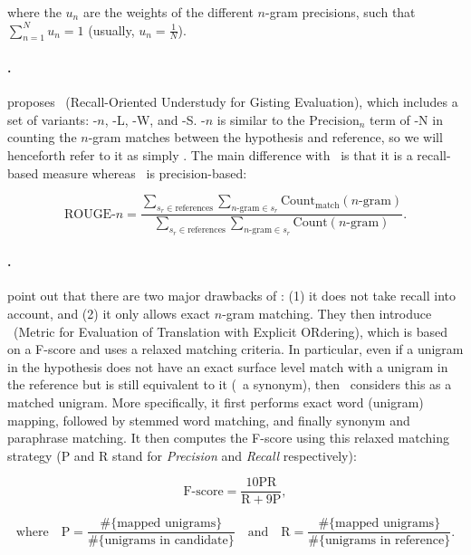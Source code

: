 where the $u_n$ are the weights of the different $n$-gram precisions, such that $\sum_{n=1}^N u_n = 1$ (usually, $u_n = \frac{1}{N}$).

\paragraph{\rouge.}
\citet{lin2004rouge} proposes \rouge\ (Recall-Oriented Understudy for Gisting Evaluation), which includes a set of variants: \rouge-$n$, \rouge-L, \rouge-W, and \rouge-S. \rouge-$n$ is similar to the $\textrm{Precision}_n$ term of \bleu-N in counting the $n$-gram matches between the hypothesis and reference, so we will henceforth refer to it as simply \rouge. The main difference with \bleu\ is that it is a recall-based measure whereas \bleu\ is precision-based:

\[ \textrm{ROUGE-}n = \frac{\sum_{s_r \in \textrm{references}} \sum_{n\textrm{-gram} \in s_r} \textrm{Count}_\textrm{match} (n\textrm{-gram})}{\sum_{s_r \in \textrm{references}} \sum_{n\textrm{-gram} \in s_r} \textrm{Count} (n\textrm{-gram})}. \]

\paragraph{\meteor.}
\citet{banerjee2005meteor} point out that there are two major drawbacks of \bleu: (1) it does not take recall into account, and (2) it only allows exact $n$-gram matching. They then introduce \meteor\ (Metric for Evaluation of Translation with Explicit ORdering), which is based on a F-score and uses a relaxed matching criteria. In particular, even if a unigram in the hypothesis does not have an exact surface level match with a unigram in the reference but is still equivalent to it (\eg\ a synonym), then \meteor\ considers this as a matched unigram. More specifically, it first performs exact word (unigram) mapping, followed by stemmed word matching, and finally synonym and paraphrase matching. It then computes the F-score using this relaxed matching strategy ($\textrm{P}$ and $\textrm{R}$ stand for \emph{Precision} and \emph{Recall} respectively):

\[ \textrm{F-score} = \frac{10 \textrm{P} \textrm{R}}{\textrm{R} + 9\textrm{P}}, \]

\[ \text{where} \quad \textrm{P} = \frac{\#\{\textrm{mapped unigrams}\}}{\#\{\textrm{unigrams in candidate}\}} \quad \text{and} \quad \textrm{R} = \frac{\#\{\textrm{mapped unigrams}\}}{\#\{\textrm{unigrams in reference}\}} . \]

